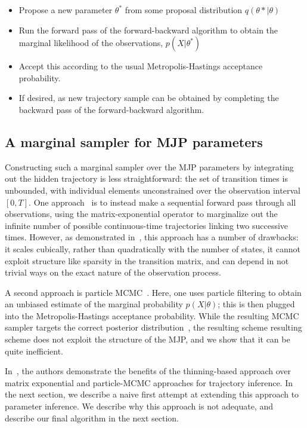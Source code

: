 \begin{itemize}
  \item Propose a new parameter $\theta^*$ from some proposal distribution
    $q(\theta*|\theta)$
  \item Run the forward pass of the forward-backward algorithm to 
    obtain the marginal likelihood of the observations, $p(X|\theta^*)$
  \item Accept this according to the usual Metropolis-Hastings acceptance
    probability.
  \item If desired, as new trajectory sample can be obtained by
    completing the backward pass of the forward-backward algorithm.
\end{itemize}

\subsection{A marginal sampler for MJP parameters} 
Constructing such a marginal sampler over the MJP parameters by
integrating out the hidden trajectory is less straightforward:
the set of transition times is unbounded, with individual elements
unconstrained over the observation interval $[0,T]$.
One approach~\cite{FearnSher2006} is to instead make a sequential 
forward pass through all observations, using the matrix-exponential
operator to marginalize out the infinite number of possible 
continuous-time trajectories linking two successive times. However, as
demonstrated in~\cite{RaoTeh13}, this approach has a number of 
drawbacks: it scales cubically, rather than quadratically with the 
number of states, it cannot exploit structure like sparsity in the 
transition matrix, and can depend in not trivial ways on the exact 
nature of the observation process.


A second approach is particle MCMC~\cite{Andrieu10}. Here, one uses 
particle filtering to obtain an unbiased estimate of the marginal 
probability $p(X|\theta)$; this is then plugged into the 
Metropolis-Hastings acceptance probability. While the resulting MCMC 
sampler targets the correct posterior distribution~\cite{Andrieu09}, 
the resulting scheme resulting scheme does not exploit the structure 
of the MJP, and we show that it can be quite inefficient.

In~\cite{RaoTeh13, RaoTeh12}, the authors demonstrate the benefits of
the thinning-based approach over matrix exponential and particle-MCMC
approaches for trajectory inference. In the next section, we describe
a naive first attempt at extending this approach to parameter inference.
We describe why this approach is not adequate, and describe our
final algorithm in the next section. 

